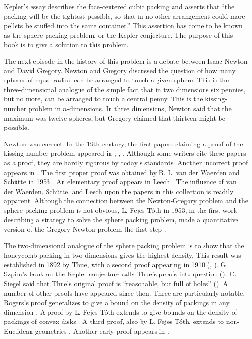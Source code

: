 Kepler's essay describes
the face-centered cubic packing and asserts that ``the packing will
be the tightest possible, so that in no other arrangement  could more
pellets be stuffed into the same container.''  This assertion has
come to be known as the sphere packing problem, or the Kepler conjecture.   
The purpose of this book is to give a solution to this problem.

\label{sec:history}

The next episode in the history of this problem is a debate between
Isaac Newton and David Gregory.  Newton and Gregory discussed the
question of how many spheres of equal radius can be arranged to
touch a given sphere.  This is the three-dimensional analogue of the
simple fact that in two dimensions six pennies, but no more, can be
arranged to touch a central penny.  This is the kissing-number
problem in $n$-dimensions. In three dimensions, Newton said that the
maximum was twelve spheres, but Gregory claimed that thirteen might
be possible.

Newton was correct.
In the 19th century, the first papers claiming a proof of the
kissing-number problem appeared
in \cite{Ben74}, \cite{Gun75}, \cite{Hop74}.
Although some writers cite these papers
as a proof, they are hardly rigorous by today's standards.
Another incorrect
proof appears in \cite{Boe52}.
  The first proper proof was obtained
by B. L. van der Waerden 
and Sch\"utte  in 1953 \cite{Sch53}.
An elementary proof appears in Leech \cite{Lee56}.
The influence of van der Waerden, Sch\"utte, and Leech upon the
papers in this collection is readily apparent.  Although the
connection between the Newton-Gregory problem and the sphere packing problem
is not obvious, L. Fejes T\'oth 
in 1953, in the first
work describing a strategy to solve the sphere packing problem, made
a quantitative version of the Gregory-Newton problem the first step
\cite{Fej53}.


The two-dimensional analogue of the sphere packing problem is to show
that the honeycomb packing in two dimensions gives the highest
density.  This result was established in 1892 by Thue, 
with a second
proof appearing in 1910 (\cite{Thu92}, \cite{Thu10}). G. Szpiro's
book on the Kepler conjecture calls Thue's proofs into question
(\cite{Szp02}).  C. Siegel 
said that Thue's original proof is
``reasonable, but full of holes'' (\cite{Szp02}). A number of other
proofs have appeared since then. Three are particularly notable.
Rogers's proof generalizes to give a bound on the density of
packings in any dimension \cite{Rog58}. A proof by L. Fejes T\'oth
extends to give bounds on the density of packings of convex disks
\cite{Fej50}. A third proof, also by L. Fejes T\'oth, extends to
non-Euclidean geometries \cite{Fej53}. Another early proof appears
in \cite{SeM44}.

